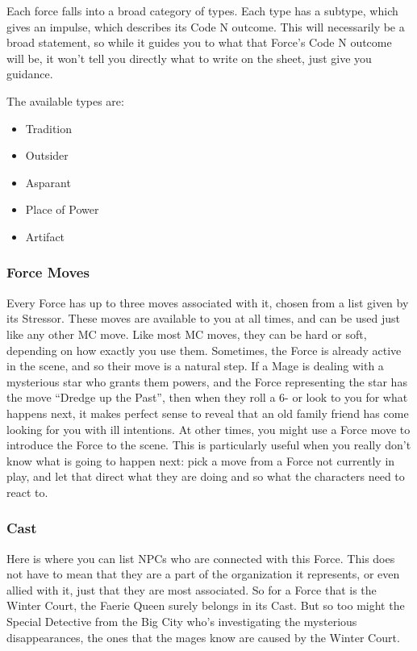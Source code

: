 \documentclass[
]{article}
\begin{document}
Each force falls into a broad category of types. Each type has a
subtype, which gives an impulse, which describes its Code N outcome.
This will necessarily be a broad statement, so while it guides you to
what that Force's Code N outcome will be, it won't tell you directly
what to write on the sheet, just give you guidance.

The available types are:

\begin{itemize}
\item
  Tradition
\item
  Outsider
\item
  Asparant
\item
  Place of Power
\item
  Artifact
\end{itemize}

\hypertarget{force-moves}{%
\subsubsection{Force Moves}\label{force-moves}}

Every Force has up to three moves associated with it, chosen from a list
given by its Stressor. These moves are available to you at all times,
and can be used just like any other MC move. Like most MC moves, they
can be hard or soft, depending on how exactly you use them. Sometimes,
the Force is already active in the scene, and so their move is a natural
step. If a Mage is dealing with a mysterious star who grants them
powers, and the Force representing the star has the move ``Dredge up the
Past'', then when they roll a 6- or look to you for what happens next,
it makes perfect sense to reveal that an old family friend has come
looking for you with ill intentions. At other times, you might use a
Force move to introduce the Force to the scene. This is particularly
useful when you really don't know what is going to happen next: pick a
move from a Force not currently in play, and let that direct what they
are doing and so what the characters need to react to.

\hypertarget{cast}{%
\subsubsection{Cast}\label{cast}}

Here is where you can list NPCs who are connected with this Force. This
does not have to mean that they are a part of the organization it
represents, or even allied with it, just that they are most associated.
So for a Force that is the Winter Court, the Faerie Queen surely belongs
in its Cast. But so too might the Special Detective from the Big City
who's investigating the mysterious disappearances, the ones that the
mages know are caused by the Winter Court.
\end{document}

